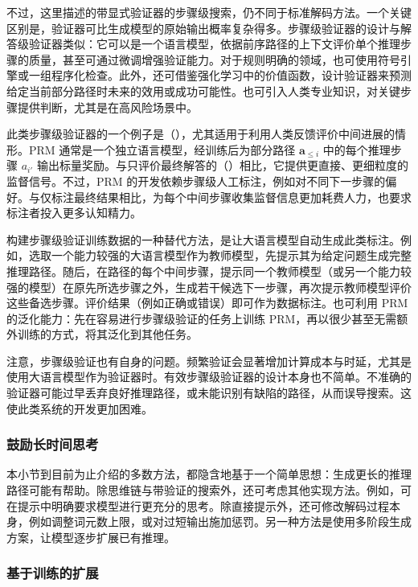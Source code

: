 不过，这里描述的带显式验证器的步骤级搜索，仍不同于标准解码方法。一个关键区别是，验证器可比生成模型的原始输出概率复杂得多。步骤级验证器的设计与解答级验证器类似：它可以是一个语言模型，依据前序路径的上下文评价单个推理步骤的质量，甚至可通过微调增强验证能力。对于规则明确的领域，也可使用符号引擎或一组程序化检查。此外，还可借鉴强化学习中的价值函数，设计验证器来预测给定当前部分路径时未来的效用或成功可能性。也可引入人类专业知识，对关键步骤提供判断，尤其是在高风险场景中。

此类步骤级验证器的一个例子是（），尤其适用于利用人类反馈评价中间进展的情形。PRM 通常是一个独立语言模型，经训练后为部分路径 $\mathbf{a}_{\le i}$ 中的每个推理步骤 $a_{i'}$ 输出标量奖励。与只评价最终解答的（）相比，它提供更直接、更细粒度的监督信号。不过，PRM 的开发依赖步骤级人工标注，例如对不同下一步骤的偏好。与仅标注最终结果相比，为每个中间步骤收集监督信息更加耗费人力，也要求标注者投入更多认知精力。

构建步骤级验证训练数据的一种替代方法，是让大语言模型自动生成此类标注。例如，选取一个能力较强的大语言模型作为教师模型，先提示其为给定问题生成完整推理路径。随后，在路径的每个中间步骤，提示同一个教师模型（或另一个能力较强的模型）在原先所选步骤之外，生成若干候选下一步骤，再次提示教师模型评价这些备选步骤。评价结果（例如正确或错误）即可作为数据标注。也可利用 PRM 的泛化能力：先在容易进行步骤级验证的任务上训练 PRM，再以很少甚至无需额外训练的方式，将其泛化到其他任务。

注意，步骤级验证也有自身的问题。频繁验证会显著增加计算成本与时延，尤其是使用大语言模型作为验证器时。有效步骤级验证器的设计本身也不简单。不准确的验证器可能过早丢弃良好推理路径，或未能识别有缺陷的路径，从而误导搜索。这使此类系统的开发更加困难。

\subsubsection{鼓励长时间思考}

本小节到目前为止介绍的多数方法，都隐含地基于一个简单思想：生成更长的推理路径可能有帮助。除思维链与带验证的搜索外，还可考虑其他实现方法。例如，可在提示中明确要求模型进行更充分的思考。除直接提示外，还可修改解码过程本身，例如调整词元数上限，或对过短输出施加惩罚。另一种方法是使用多阶段生成方案，让模型逐步扩展已有推理。

\subsubsection{基于训练的扩展}

